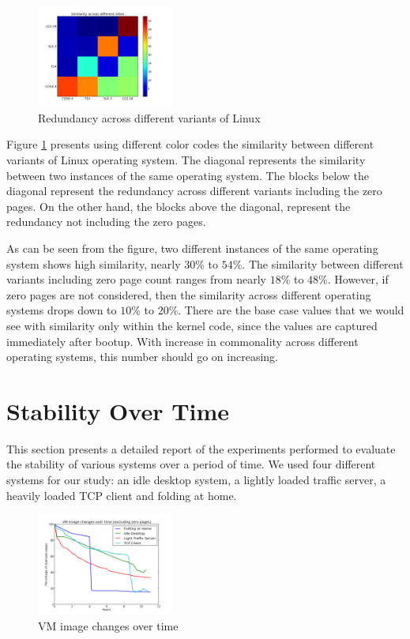 \documentclass{acm_proc_article-sp}
\begin{document}
\begin{figure}
  \centering
  \includegraphics[width=0.4\textwidth]{images/diff_var.png}
  \caption{Redundancy across different variants of Linux}\label{fig:diff_var}
\end{figure}

Figure \ref{fig:diff_var} presents using different color codes the similarity between different variants of Linux operating system. The diagonal represents the similarity between two instances of the same operating system. The blocks below the diagonal represent the redundancy across different variants including the zero pages. On the other hand, the blocks above the diagonal, represent the redundancy not including the zero pages.

As can be seen from the figure, two different instances of the same operating system shows high similarity, nearly $30$\% to $54$\%. The similarity between different variants including zero page count ranges from nearly $18$\% to $48$\%. However, if zero pages are not considered, then the similarity across different operating systems drops down to $10$\% to $20$\%. There are the base case values that we would see with similarity only within the kernel code, since the values are captured immediately after bootup. With increase in commonality across different operating systems, this number should go on increasing.

\section{Stability Over Time}
This section presents a detailed report of the experiments performed to evaluate the stability of various systems over a period of time. We used four different systems for our study: an idle desktop system, a lightly loaded traffic server, a heavily loaded TCP client and folding at home.


\begin{figure}
  \centering
  \includegraphics[width=0.4\textwidth]{images/vm_vs_time.png}
  \caption{VM image changes over time}\label{fig:vm_vs_time}
\end{figure}
\end{document}
